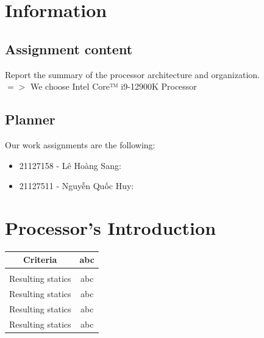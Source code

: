 \documentclass{article}
\begin{document}
\pagestyle{fancy}
\fancyhf{}
\addtolength{\topmargin}{-0.70894pt}
\setlength{\headheight}{12.70894pt}

\rfoot{\textbf{\thepage}}



\tableofcontents

\pagebreak

\section{Information}

\subsection{Assignment content}
\Large{Report the summary of the processor architecture and organization.\\
$=>$ We choose Intel Core™ i9-12900K Processor}

\subsection{Planner}
\Large{
Our work assignments are the following:
\begin{itemize}
    \item 21127158 - Lê Hoàng Sang: 
    \item 21127511 - Nguyễn Quốc Huy:
\end{itemize}
}
\pagebreak


\section{Processor's Introduction}

\begin{tabular}{|c|c|}
\hline
Criteria                           & abc  \\ 
\hline                                                                                                                                                                                                                                                                                                                                                                         \\ \hline
Resulting statics                  & abc  \\ 
\hline
Resulting statics                  & abc  \\ 
\hline
Resulting statics                  & abc  \\ 
\hline
Resulting statics                  & abc  \\ 
\hline


\end{tabular}
\end{document}
